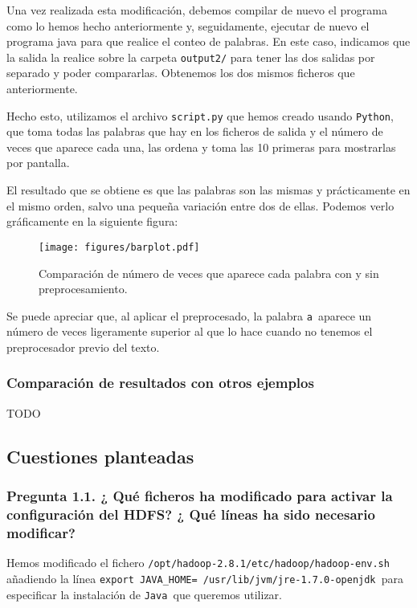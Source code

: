 \documentclass[11pt]{article}
\def\inline{\lstinline[basicstyle=\ttfamily,keywordstyle={}]}
\begin{document}
Una vez realizada esta modificación, debemos compilar de nuevo el programa como lo hemos hecho anteriormente y, seguidamente, ejecutar de nuevo el programa java para que realice el conteo de palabras. En este caso, indicamos que la salida la realice sobre la carpeta  \inline{output2/} para tener las dos salidas por separado y poder compararlas. Obtenemos los dos mismos ficheros que anteriormente.

Hecho esto, utilizamos el archivo  \inline{script.py} que hemos creado usando  \inline{Python}, que toma todas las palabras que hay en los ficheros de salida y el número de veces que aparece cada una, las ordena y toma las 10 primeras para mostrarlas por pantalla. 

El resultado que se obtiene es que las palabras son las mismas y prácticamente en el mismo orden, salvo una pequeña variación entre dos de ellas. Podemos verlo gráficamente en la siguiente figura:

\begin{figure}[H]
	\centering
	\texttt{[image: figures/barplot.pdf]}
	\caption{Comparación de número de veces que aparece cada palabra con y sin preprocesamiento.}
\end{figure}

Se puede apreciar que, al aplicar el preprocesado, la palabra \inline{a }aparece un número de veces ligeramente superior al que lo hace cuando no tenemos el preprocesador previo del texto.


\subsubsection*{ Comparación de resultados con otros ejemplos}

TODO







\subsection{ Cuestiones planteadas}

\subsubsection*{ Pregunta 1.1. ¿ Qué ficheros ha modificado para activar la configuración del HDFS? ¿ Qué líneas ha sido necesario modificar?}

Hemos modificado el fichero \inline{/opt/hadoop-2.8.1/etc/hadoop/hadoop-env.sh }añadiendo la línea \inline{export JAVA_HOME= /usr/lib/jvm/jre-1.7.0-openjdk }para especificar la instalación de \inline{Java }que queremos utilizar.
\end{document}
